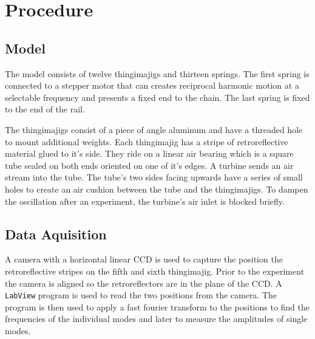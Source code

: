 \chapter{Procedure}
\section{Model}
The model consists of twelve thingimajigs and thirteen springs.
The first spring is connected to a stepper motor that can creates reciprocal harmonic motion at a selectable frequency and presents a fixed end to the chain.
The last spring is fixed to the end of the rail.

The thingimajigs consist of a piece of angle aluminum and have a threaded hole to mount additional weights.
Each thingimajig has a stripe of retroreflective material glued to it's side.
They ride on a linear air bearing which is a square tube sealed on both ends oriented on one of it's edges.
A turbine sends an air stream into the tube.
The tube's two sides facing upwards have a series of small holes to create an air cushion between the tube and the thingimajigs.
To dampen the oscillation after an experiment, the turbine's air inlet is blocked briefly.

\section{Data Aquisition}
A camera with a horizontal linear CCD is used to capture the position the retroreflective stripes on the fifth and sixth thingimajig.
Prior to the experiment the camera is aligned so the retroreflectors are in the plane of the CCD.
A \texttt{LabView} program is used to read the two positions from the camera.
The program is then used to apply a fast fourier transform to the positions to find the frequencies of the individual modes and later to measure the amplitudes of single modes.
